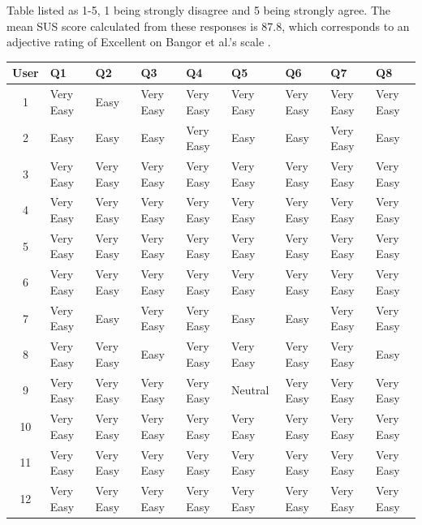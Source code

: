 \documentclass[12pt,nonacm,acmlarge,titlepage,screen]{acmart}
\begin{document}
Table listed as 1-5, 1 being strongly disagree and 5 being strongly agree. The mean SUS score calculated from these responses is 87.8, which corresponds to an adjective rating of Excellent on Bangor et al.'s scale \cite{bangor_sus_2009}.

\clearpage

\begin{table}[htbp]
    \centering
    \footnotesize
    \renewcommand{\arraystretch}{1.3}
    
    \begin{tabularx}{\textwidth}{| c | *{8}{X |}}
        \hline
        \textbf{User} & \textbf{Q1} & \textbf{Q2} & \textbf{Q3} & \textbf{Q4} & \textbf{Q5} & \textbf{Q6} & \textbf{Q7} & \textbf{Q8} \\ \hline
        1  & Very Easy & Easy      & Very Easy & Very Easy   & Very Easy & Very Easy & Very Easy & Very Easy \\ \hline
        2  & Easy      & Easy      & Easy      & Very Easy   & Easy      & Easy      & Very Easy & Easy      \\ \hline
        3  & Very Easy & Very Easy & Very Easy & Very Easy   & Very Easy & Very Easy & Very Easy & Very Easy \\ \hline
        4  & Very Easy & Very Easy & Very Easy & Very Easy   & Very Easy & Very Easy & Very Easy & Very Easy \\ \hline
        5  & Very Easy & Very Easy & Very Easy & Very Easy   & Very Easy & Very Easy & Very Easy & Very Easy \\ \hline
        6  & Very Easy & Very Easy & Very Easy & Very Easy   & Very Easy & Very Easy & Very Easy & Very Easy \\ \hline
        7  & Very Easy & Easy      & Very Easy & Very Easy   & Easy      & Easy      & Very Easy & Very Easy \\ \hline
        8  & Very Easy & Very Easy & Easy      & Very Easy   & Very Easy & Very Easy & Very Easy & Easy      \\ \hline
        9  & Very Easy & Very Easy & Very Easy & Very Easy   & Neutral   & Very Easy & Very Easy & Very Easy \\ \hline
        10 & Very Easy & Very Easy & Very Easy & Very Easy   & Very Easy & Very Easy & Very Easy & Very Easy \\ \hline
        11 & Very Easy & Very Easy & Very Easy & Very Easy   & Very Easy & Very Easy & Very Easy & Very Easy \\ \hline
        12 & Very Easy & Very Easy & Very Easy & Very Easy   & Very Easy & Very Easy & Very Easy & Very Easy \\ \hline

\end{tabularx}
\end{table}
\end{document}
